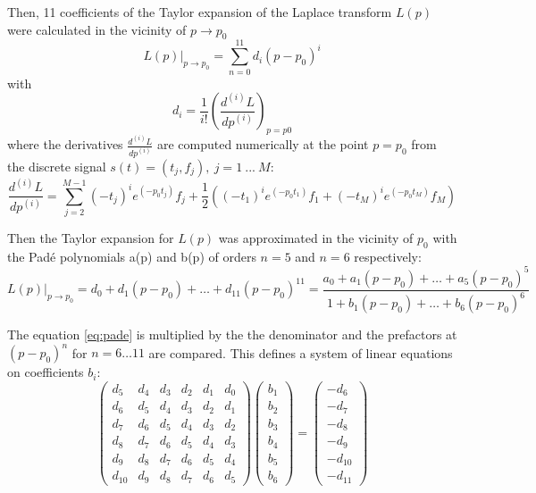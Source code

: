 Then, 11 coefficients of the Taylor expansion of the Laplace transform $L(p)$ were calculated in the vicinity of $p \rightarrow p_0$\\

\begin{equation}
L(p)\vert_{p \rightarrow p_0} = \sum_{n=0}^{11} d_i (p-p_0)^i
\end{equation}
with
\begin{equation}
d_i = \frac{1}{i!}\left(\frac{d^{(i)}L}{dp^{(i)}}\right)_{p=p0}
\end{equation}
where the derivatives $\frac{d^{(i)}L}{dp^{(i)}}$ are computed numerically at the point $p=p_{0}$ from the discrete signal $s(t) = (t_j,f_j),~j=1~...~M$:
\begin{equation}
\frac{d^{(i)}L}{dp^{(i)}}= \sum_{j=2}^{M-1}(-t_j)^ie^{(-p_0t_j)}f_j + \frac{1}{2}\left((-t_1)^ie^{(-p_0t_1)}f_1+(-t_M)^ie^{(-p_0t_M)}f_M \right)
\end{equation}


Then the Taylor expansion for $L(p)$ was approximated in the vicinity of $p_0$ with the Pad{\'e} polynomials a(p) and b(p) of orders $n=5$ and $n=6$ respectively:\\

\begin{equation}
\label{eq:pade}
L(p)\vert_{p \rightarrow p_0} = d_0+d_1(p-p_0)+\dots+d_{11}(p-p_0)^{11}=\frac{a_0 + a_1(p-p_0) + \dots + a_5(p-p_0)^5}  {1 + b_1(p-p_0)+ \dots+ b_6(p-p_0)^6}
\end{equation}

The equation \ref{eq:pade} is multiplied by the the denominator and the prefactors at $(p-p_0)^{n}$ for $n=6\dots11$ are compared. This defines a system of linear equations on coefficients $b_i$:\\


\begin{equation}\label{eq:matrix}
  \begin{pmatrix}
    d_{5} & d_{4} & d_{3} & d_2 & d_1 & d_0\\
    d_6 & d_5 & d_4 & d_3 & d_2 & d_1\\
    d_7 & d_6 & d_5 & d_4 & d_3 & d_2\\
    d_8 & d_7 & d_6 & d_5 & d_4 & d_3\\
    d_9 & d_8 & d_7 & d_6 & d_5 & d_4\\
    d_{10} & d_9 & d_8 & d_7 & d_6 & d_5
  \end{pmatrix}
       \begin{pmatrix}
   b_1\\
   b_2\\
   b_3\\
   b_4\\
   b_5\\
   b_6
   \end{pmatrix}
  =
    \begin{pmatrix}
   -d_6\\
   -d_7\\
   -d_8\\
   -d_9\\
   -d_{10}\\
   -d_{11}
   \end{pmatrix}
\end{equation}

